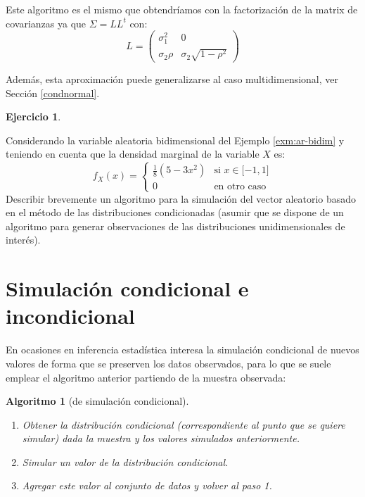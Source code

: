 \documentclass[
]{book}
\theoremstyle{break}
\newtheorem{conjecture}{Algoritmo}[chapter]
\theoremstyle{definition}
\theoremstyle{definition}
\theoremstyle{definition}
\newtheorem{exercise}{Ejercicio}[chapter]
\theoremstyle{definition}
\theoremstyle{remark}
\begin{document}
Este algoritmo es el mismo que obtendríamos con la factorización de la matrix de covarianzas
ya que \(\Sigma = L L^t\) con:
\[L = \begin{pmatrix}
 \sigma^2_1 &  0 \\
 \sigma_2 \rho &  \sigma_2  \sqrt{1-\rho^2}
\end{pmatrix}\]

Además, esta aproximación puede generalizarse al caso multidimensional, ver Sección \ref{condnormal}.

\begin{exercise}
\protect\hypertarget{exr:cond2d}{}{\label{exr:cond2d} }
\end{exercise}

Considerando la variable aleatoria bidimensional del Ejemplo \ref{exm:ar-bidim} y teniendo en cuenta que la densidad marginal de la
variable \(X\) es:
\[f_{X}(x)=\left\{ 
\begin{array}{cl}
\frac{1}{8}\left( 5-3x^2\right)  & \text{si }x\in \lbrack -1,1] \\ 
0 & \text{en otro caso}
\end{array}
\right.\]
Describir brevemente un algoritmo para la simulación del
vector aleatorio basado en el método de las distribuciones
condicionadas (asumir que se dispone de un algoritmo para generar
observaciones de las distribuciones unidimensionales de interés).

\hypertarget{simulaciuxf3n-condicional-e-incondicional}{%
\section{Simulación condicional e incondicional}\label{simulaciuxf3n-condicional-e-incondicional}}

En ocasiones en inferencia estadística interesa la simulación condicional de nuevos valores de forma que se preserven los datos observados, para lo que se suele emplear el algoritmo anterior partiendo de la muestra observada:

\begin{conjecture}[de simulación condicional]
\protect\hypertarget{cnj:cond-incond}{}{\label{cnj:cond-incond} {} }

\begin{enumerate}
\def\labelenumi{\arabic{enumi}.}
\item
  Obtener la distribución condicional (correspondiente al punto
  que se quiere simular) dada la muestra y los valores simulados
  anteriormente.
\item
  Simular un valor de la distribución condicional.
\item
  Agregar este valor al conjunto de datos y volver al paso 1.
\end{enumerate}
\end{conjecture}
\end{document}
